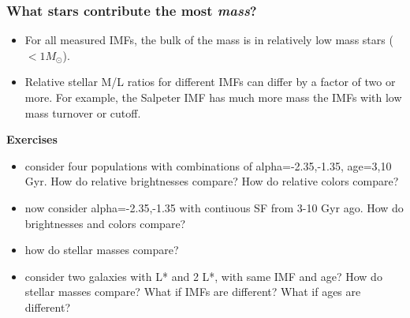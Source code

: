 \documentclass{article}
\begin{document}
\subsubsection{What stars contribute the most \emph{mass}?}
\begin{itemize}
    \item For all measured IMFs, the bulk of the mass is in relatively
        low mass stars ($< 1 M_{\odot}$).
    \item Relative stellar M/L ratios for different IMFs can differ
        by a factor of two or more. For example, the Salpeter IMF has much more
        mass the IMFs with low mass turnover or cutoff.
\end{itemize}

\begin{framed}
    \textbf{Exercises}
    \begin{itemize}
        \item consider four populations with combinations of alpha=-2.35,-1.35,
            age=3,10 Gyr. How do relative brightnesses compare?
            How do relative colors compare?
        \item now consider alpha=-2.35,-1.35 with contiuous SF from 3-10 Gyr ago.
            How do brightnesses and colors compare?
        \item how do stellar masses compare?
        \item consider two galaxies with L* and 2 L*, with same IMF and age?
            How do stellar masses compare? What if IMFs are different?
            What if ages are different?
    \end{itemize}
\end{framed}
\end{document}

